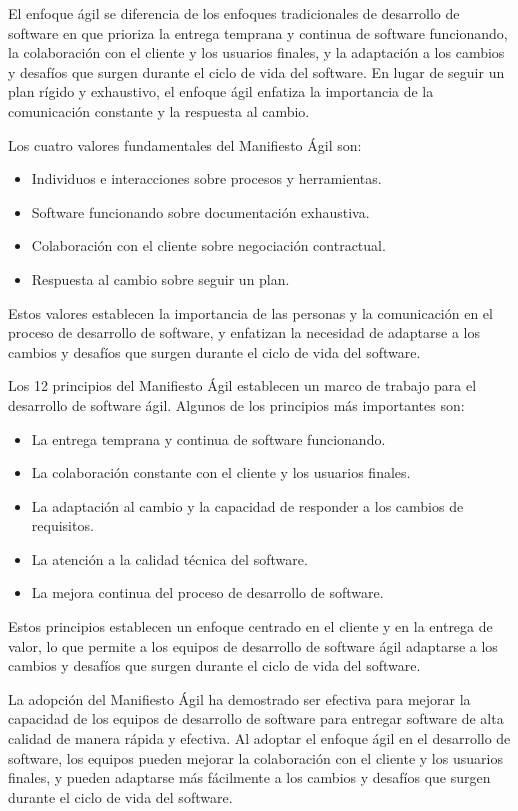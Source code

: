 \documentclass[executivepaper]{article}
\begin{document}
El enfoque ágil se diferencia de los enfoques tradicionales de desarrollo de software en que prioriza la entrega temprana y continua de software funcionando, la colaboración con el cliente y los usuarios finales, y la adaptación a los cambios y desafíos que surgen durante el ciclo de vida del software. En lugar de seguir un plan rígido y exhaustivo, el enfoque ágil enfatiza la importancia de la comunicación constante y la respuesta al cambio.

Los cuatro valores fundamentales del Manifiesto Ágil son:

\begin{itemize}
\item Individuos e interacciones sobre procesos y herramientas.
\item Software funcionando sobre documentación exhaustiva.
\item Colaboración con el cliente sobre negociación contractual.
\item Respuesta al cambio sobre seguir un plan.
\end{itemize}

Estos valores establecen la importancia de las personas y la comunicación en el proceso de desarrollo de software, y enfatizan la necesidad de adaptarse a los cambios y desafíos que surgen durante el ciclo de vida del software.

Los 12 principios del Manifiesto Ágil establecen un marco de trabajo para el desarrollo de software ágil. Algunos de los principios más importantes son:

\begin{itemize}
\item La entrega temprana y continua de software funcionando.
\item La colaboración constante con el cliente y los usuarios finales.
\item La adaptación al cambio y la capacidad de responder a los cambios de requisitos.
\item La atención a la calidad técnica del software.
\item La mejora continua del proceso de desarrollo de software.
\end{itemize}

Estos principios establecen un enfoque centrado en el cliente y en la entrega de valor, lo que permite a los equipos de desarrollo de software ágil adaptarse a los cambios y desafíos que surgen durante el ciclo de vida del software.

La adopción del Manifiesto Ágil ha demostrado ser efectiva para mejorar la capacidad de los equipos de desarrollo de software para entregar software de alta calidad de manera rápida y efectiva. Al adoptar el enfoque ágil en el desarrollo de software, los equipos pueden mejorar la colaboración con el cliente y los usuarios finales, y pueden adaptarse más fácilmente a los cambios y desafíos que surgen durante el ciclo de vida del software.
\end{document}
